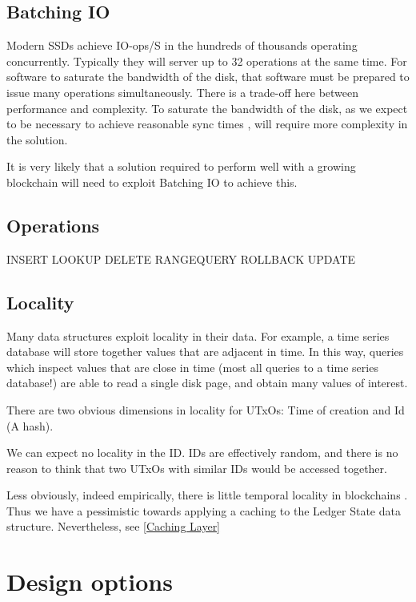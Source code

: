\documentclass[11pt,a4paper]{article}
\begin{document}
\subsection{Batching IO}
\label{Batching IO}
Modern SSDs achieve IO-ops/S in the hundreds of thousands operating concurrently.
Typically they will server up to 32 operations at the same time. For software to
saturate the bandwidth of the disk, that software must be prepared to issue many
operations simultaneously. There is a trade-off here between performance and
complexity. To saturate the bandwidth of the disk, as we expect to be necessary
to achieve reasonable sync times , will require more complexity in
the solution.

It is very likely that a solution required to perform well with a growing
blockchain will need to exploit Batching IO to achieve this.

\subsection{Operations}
\label{Operations}

INSERT
LOOKUP
DELETE
RANGEQUERY
ROLLBACK
UPDATE

\subsection{Locality}

Many data structures exploit locality in their data. For example, a time series database will store together values that are adjacent in time. In this way, queries which inspect values that are close in time (most all queries to a time series database!) are able to read a single disk page, and obtain many values of interest.

There are two obvious dimensions in locality for UTxOs: Time of creation and Id (A hash).

We can expect no locality in the ID. IDs are effectively random, and there is no reason to think that two UTxOs with similar IDs would be accessed together.

Less obviously, indeed empirically, there is little temporal locality in blockchains .
Thus we have a pessimistic towards applying a caching to the Ledger State data structure. Nevertheless, see \ref{Caching Layer}

\section{Design options}
\label{options}
\end{document}
